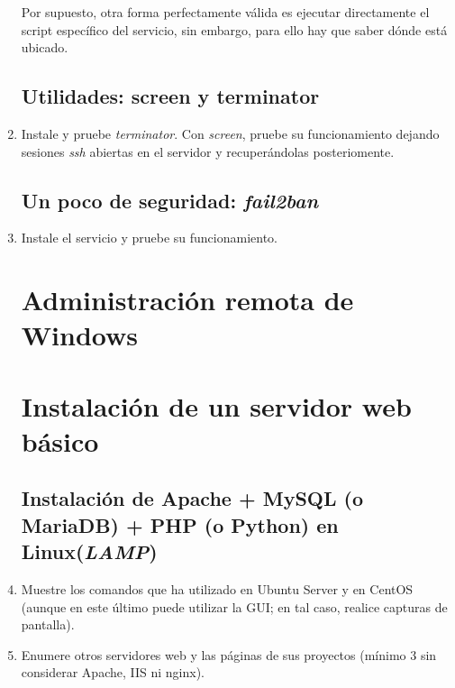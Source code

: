 \documentclass[paper=a4, fontsize=11pt]{scrartcl} %
\numberwithin{equation}{section} %
\numberwithin{figure}{section} %
\numberwithin{table}{section} %
\begin{document}
\begin{enumerate}
		Por supuesto, otra forma perfectamente válida es ejecutar directamente el script específico del
		servicio, sin embargo, para ello hay que saber dónde está ubicado.
		
	
	\subsection{Utilidades: screen y terminator}
		\item Instale y pruebe \textit{terminator}. Con \textit{screen}, pruebe su funcionamiento
		dejando sesiones \textit{ssh} abiertas en el servidor y recuperándolas posteriomente.
	
	\subsection{Un poco de seguridad: \textit{fail2ban}}
		\item Instale el servicio y pruebe su funcionamiento.
	
	\section{Administración remota de Windows}
	\section{Instalación de un servidor web básico}
	\subsection{Instalación de Apache + MySQL (o MariaDB) + PHP (o Python) en Linux(\textit{LAMP})}
		\item Muestre los comandos que ha utilizado en Ubuntu Server y en CentOS (aunque en este último
		puede utilizar la GUI; en tal caso, realice capturas de pantalla).
		
		
		\item Enumere otros servidores web y las páginas de sus proyectos (mínimo 3 sin considerar
		Apache, IIS ni nginx).
		

\end{enumerate}
\end{document}
